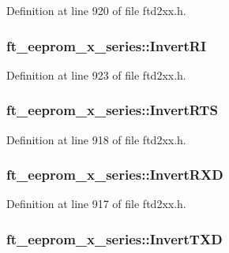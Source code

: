 Definition at line 920 of file ftd2xx.h.\hypertarget{structft__eeprom__x__series_ac68d911f8f6fd11b9ffe0d397a6eeca6}{
\subsubsection[{InvertRI}]{ {\bf ft\_\-eeprom\_\-x\_\-series::InvertRI}}}
\label{structft__eeprom__x__series_ac68d911f8f6fd11b9ffe0d397a6eeca6}


Definition at line 923 of file ftd2xx.h.\hypertarget{structft__eeprom__x__series_ad91ce924b72723ca294cc88da678f85d}{
\subsubsection[{InvertRTS}]{ {\bf ft\_\-eeprom\_\-x\_\-series::InvertRTS}}}
\label{structft__eeprom__x__series_ad91ce924b72723ca294cc88da678f85d}


Definition at line 918 of file ftd2xx.h.\hypertarget{structft__eeprom__x__series_a01ecab15eacb417a6e5897f8d09fb585}{
\subsubsection[{InvertRXD}]{ {\bf ft\_\-eeprom\_\-x\_\-series::InvertRXD}}}
\label{structft__eeprom__x__series_a01ecab15eacb417a6e5897f8d09fb585}


Definition at line 917 of file ftd2xx.h.\hypertarget{structft__eeprom__x__series_a62798961d771e89afc6d573f83ddfe20}{
\subsubsection[{InvertTXD}]{ {\bf ft\_\-eeprom\_\-x\_\-series::InvertTXD}}}
\label{structft__eeprom__x__series_a62798961d771e89afc6d573f83ddfe20}


